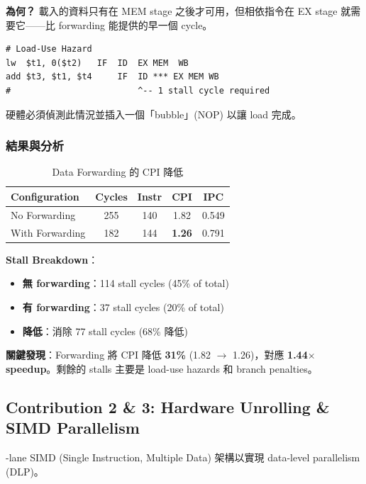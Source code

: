 \documentclass[journal]{IEEEtran}
\newcommand{\tagit}[1]{\textit{#1}}
\newcommand{\Goal}{\tagit{目標：}}
\begin{document}
\textbf{為何？} 載入的資料只有在 MEM stage 之後才可用，但相依指令在 EX stage 就需要它——比 forwarding 能提供的早一個 cycle。

\begin{lstlisting}
# Load-Use Hazard
lw  $t1, 0($t2)   IF  ID  EX MEM  WB
add $t3, $t1, $t4     IF  ID *** EX MEM WB
#                         ^-- 1 stall cycle required
\end{lstlisting}

硬體必須偵測此情況並插入一個「bubble」(NOP) 以讓 load 完成。

\subsubsection{結果與分析}
\begin{table}[!t]
\centering
\caption{Data Forwarding 的 CPI 降低}
\footnotesize
\begin{tabular}{@{}lcccc@{}}
\toprule
\textbf{Configuration} & \textbf{Cycles} & \textbf{Instr} & \textbf{CPI} & \textbf{IPC} \\
\midrule
No Forwarding & 255 & 140 & 1.82 & 0.549 \\
With Forwarding & 182 & 144 & \textbf{1.26} & 0.791 \\
\bottomrule
\end{tabular}
\end{table}

\textbf{Stall Breakdown}：
\begin{itemize}
    \item \textbf{無 forwarding}：114 stall cycles (45\% of total)
    \item \textbf{有 forwarding}：37 stall cycles (20\% of total)
    \item \textbf{降低}：消除 77 stall cycles (68\% 降低)
\end{itemize}

\textbf{關鍵發現}：Forwarding 將 CPI 降低 \textbf{31\%} (1.82 $\rightarrow$ 1.26)，對應 \textbf{1.44$\times$ speedup}。剩餘的 stalls 主要是 load-use hazards 和 branch penalties。

\subsection{Contribution 2 \& 3: Hardware Unrolling \& SIMD Parallelism}

-lane SIMD (Single Instruction, Multiple Data) 架構以實現 data-level parallelism (DLP)。
\end{document}
